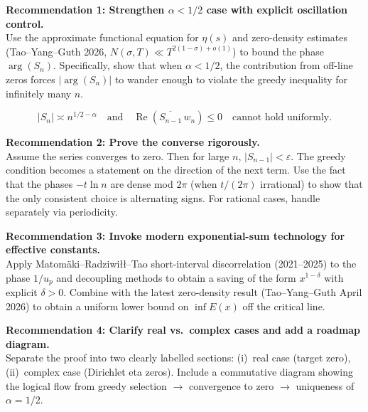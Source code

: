 \documentclass[11pt,a4paper]{article}
\begin{document}
\begin{tcolorbox}[rigour]
\textbf{Recommendation 1: Strengthen $\alpha < 1/2$ case with explicit oscillation control.}\\[4pt]
Use the approximate functional equation for $\eta(s)$ and zero-density estimates (Tao--Yang--Guth 2026, $N(\sigma,T) \ll T^{2(1-\sigma)+o(1)}$) to bound the phase $\arg(S_n)$. Specifically, show that when $\alpha < 1/2$, the contribution from off-line zeros forces $|\arg(S_n)|$ to wander enough to violate the greedy inequality for infinitely many $n$.

\begin{tcolorbox}[mathblock]
\[
|S_n| \asymp n^{1/2 - \alpha} \quad \text{and} \quad \operatorname{Re}(\overline{S_{n-1}}\, w_n) \le 0 \quad \text{cannot hold uniformly.}
\]
\end{tcolorbox}
\end{tcolorbox}

\begin{tcolorbox}[rigour]
\textbf{Recommendation 2: Prove the converse rigorously.}\\[4pt]
Assume the series converges to zero. Then for large $n$, $|S_{n-1}| < \varepsilon$. The greedy condition becomes a statement on the direction of the next term. Use the fact that the phases $-t \ln n$ are dense mod $2\pi$ (when $t/(2\pi)$ irrational) to show that the only consistent choice is alternating signs. For rational cases, handle separately via periodicity.
\end{tcolorbox}

\begin{tcolorbox}[rigour]
\textbf{Recommendation 3: Invoke modern exponential-sum technology for effective constants.}\\[4pt]
Apply Matom\"aki--Radziwi\l\l--Tao short-interval discorrelation (2021--2025) to the phase $1/u_p$ and decoupling methods to obtain a saving of the form $x^{1 - \delta}$ with explicit $\delta > 0$. Combine with the latest zero-density result (Tao--Yang--Guth April 2026) to obtain a uniform lower bound on $\inf E(x)$ off the critical line.
\end{tcolorbox}

\begin{tcolorbox}[rigour]
\textbf{Recommendation 4: Clarify real vs.\ complex cases and add a roadmap diagram.}\\[4pt]
Separate the proof into two clearly labelled sections: (i)~real case (target zero), (ii)~complex case (Dirichlet eta zeros). Include a commutative diagram showing the logical flow from greedy selection $\to$ convergence to zero $\to$ uniqueness of $\alpha = 1/2$.
\end{tcolorbox}
\end{document}
